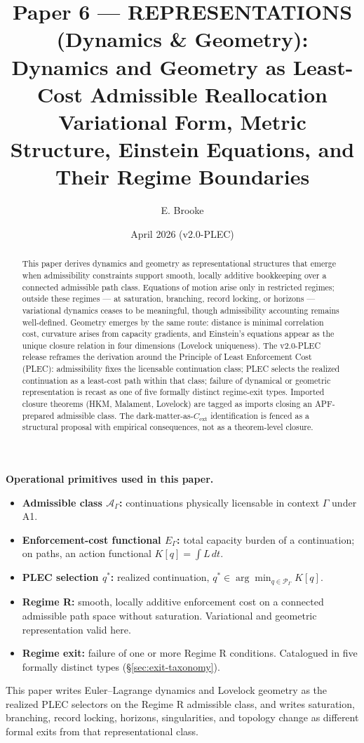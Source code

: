 \documentclass[11pt]{article}
\title{Paper 6 --- REPRESENTATIONS (Dynamics \& Geometry):\\
Dynamics and Geometry as Least-Cost Admissible Reallocation\\[2pt]
\large Variational Form, Metric Structure, Einstein Equations, and Their Regime Boundaries}
\author{E. Brooke}
\date{April 2026 (v2.0-PLEC)}
\begin{document}
\maketitle

\begin{abstract}
This paper derives dynamics and geometry as representational structures that emerge
when admissibility constraints support smooth, locally additive bookkeeping over a
connected admissible path class. Equations of motion arise only in restricted
regimes; outside these regimes --- at saturation, branching, record locking, or
horizons --- variational dynamics ceases to be meaningful, though admissibility
accounting remains well-defined. Geometry emerges by the same route: distance is
minimal correlation cost, curvature arises from capacity gradients, and Einstein's
equations appear as the unique closure relation in four dimensions (Lovelock
uniqueness). The v2.0-PLEC release reframes the derivation around the Principle
of Least Enforcement Cost (PLEC): admissibility fixes the licensable continuation
class; PLEC selects the realized continuation as a least-cost path within that
class; failure of dynamical or geometric representation is recast as one of five
formally distinct regime-exit types. Imported closure theorems (HKM, Malament,
Lovelock) are tagged as imports closing an APF-prepared admissible class. The
dark-matter-as-$C_{\mathrm{ext}}$ identification is fenced as a structural
proposal with empirical consequences, not as a theorem-level closure.
\end{abstract}

\begin{wayfinder}
\textbf{Operational primitives used in this paper.}
\begin{itemize}[leftmargin=1.5em,nosep]
    \item \textbf{Admissible class $\mathcal{A}_{\Gamma}$:} continuations
    physically licensable in context $\Gamma$ under A1.
    \item \textbf{Enforcement-cost functional $E_{\Gamma}$:} total capacity burden
    of a continuation; on paths, an action functional $K[q] = \int L\,dt$.
    \item \textbf{PLEC selection $q^{\ast}$:} realized continuation,
    $q^{\ast} \in \arg\min_{q \in \mathcal{P}_{\Gamma}} K[q]$.
    \item \textbf{Regime R:} smooth, locally additive enforcement cost on a
    connected admissible path space without saturation. Variational and geometric
    representation valid here.
    \item \textbf{Regime exit:} failure of one or more Regime R conditions.
    Catalogued in five formally distinct types (\S\ref{sec:exit-taxonomy}).
\end{itemize}
This paper writes Euler--Lagrange dynamics and Lovelock geometry as the realized
PLEC selectors on the Regime R admissible class, and writes saturation, branching,
record locking, horizons, singularities, and topology change as different formal
exits from that representational class.
\end{wayfinder}
\end{document}
